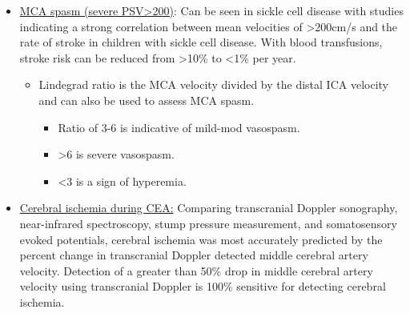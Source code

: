 \documentclass[
]{book}
\begin{document}
\begin{itemize}
\item
  \uline{MCA spasm (severe PSV\textgreater200)}: Can be seen in sickle
  cell disease with studies indicating a strong correlation between
  mean velocities of \textgreater200cm/s and the rate of stroke in children with
  sickle cell disease. With blood transfusions, stroke risk can be
  reduced from \textgreater10\% to \textless1\% per year.
  \citep{bulasTranscranialDopplerTCD2000}

  \begin{itemize}
  \item
    Lindegrad ratio is the MCA velocity divided by the distal ICA
    velocity and can also be used to assess MCA spasm.

    \begin{itemize}
    \item
      Ratio of 3-6 is indicative of mild-mod vasospasm.
    \item
      \textgreater6 is severe vasospasm.
    \item
      \textless3 is a sign of hyperemia.\citep{kirsch2013}
    \end{itemize}
  \end{itemize}
\item
  \uline{Cerebral ischemia during CEA:} Comparing transcranial
  Doppler sonography, near-infrared spectroscopy, stump pressure
  measurement, and somatosensory evoked potentials, cerebral ischemia
  was most accurately predicted by the percent change in transcranial
  Doppler detected middle cerebral artery velocity. Detection of a
  greater than 50\% drop in middle cerebral artery velocity using
  transcranial Doppler is 100\% sensitive for detecting cerebral
  ischemia.\citep{moritzAccuracyCerebralMonitoring2007}


\end{itemize}
\end{document}
